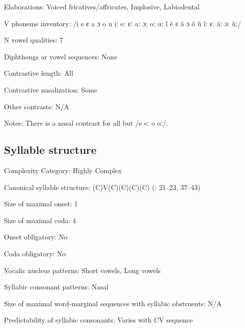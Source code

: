 {\begin{appendixdesc}
\item[Elaborations:] Voiced fricatives/affricates, Implosive, Labiodental

\item[V phoneme inventory:] /i e ɛ a ɔ o u iː eː ɛː aː ɔː oː uː ĩ ẽ ɛ ã ɔ õ ũ ĩː ɛː ãː ɔː ũː/

\item[N vowel qualities:] 7

\item[Diphthongs or vowel sequences:] None

\item[Contrastive length:] All

\item[Contrastive nasalization:] Some

\item[Other contrasts:] N/A

\item[Notes:] There is a nasal contrast for all but /e eː o oː/.
\end{appendixdesc}
\subsection*{Syllable structure}
\begin{appendixdesc}

\item[Complexity Category:] Highly Complex

\item[Canonical syllable structure:] (C)V(C)(C)(C)(C) (\citealt{WieringWiering1994}: 21--23, 37--43)

\item[Size of maximal onset:] 1

\item[Size of maximal coda:] 4

\item[Onset obligatory:] No

\item[Coda obligatory:] No

\item[Vocalic nucleus patterns:] Short vowels, Long vowels

\item[Syllabic consonant patterns:] Nasal

\item[Size of maximal word-marginal sequences with syllabic obstruents:] N/A

\item[Predictability of syllabic consonants:] Varies with CV sequence


\end{appendixdesc}}
